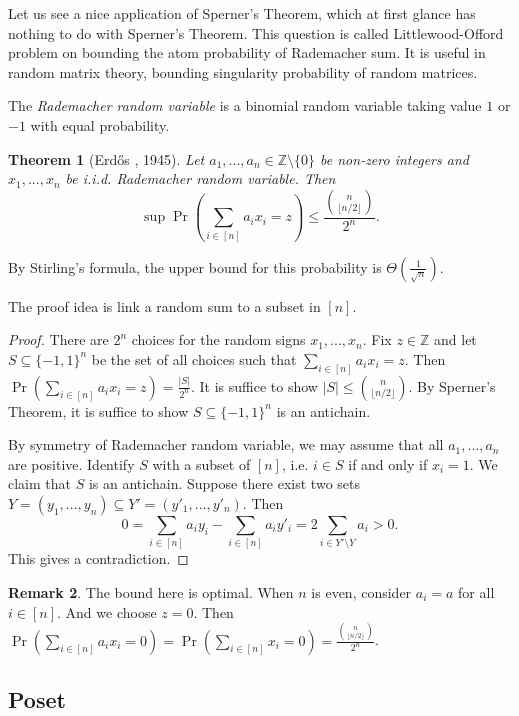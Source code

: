 \documentclass{article}
\newtheorem{theorem}{Theorem}[section]
\theoremstyle{definition}
\newtheorem{remark}[theorem]{Remark}
\def\Erdos{Erd\H{o}s}
\begin{document}
Let us see a nice application of Sperner's Theorem, which at first glance has nothing to do with Sperner's Theorem. This question is called Littlewood-Offord problem on bounding the atom probability of Rademacher sum. It is useful in random matrix theory, bounding singularity probability of random matrices. 

The \emph{Rademacher random variable} is a binomial random variable taking value $1$ or $-1$ with equal probability. 

\begin{theorem}[\Erdos{} \cite{erdos1945littlewood}, 1945]
    Let $a_1,...,a_n \in \mathbb{Z}\setminus\{0\}$ be non-zero integers and $x_1,...,x_n$ be i.i.d. Rademacher random variable. Then
    \[
    \sup \Pr(\sum_{i\in[n]}a_i x_i = z) \leq \frac{\binom{n}{\lfloor n/2 \rfloor}}{2^n}.
    \]
\end{theorem}

By Stirling's formula, the upper bound for this probability is $\Theta(\frac{1}{\sqrt{n}})$. 

The proof idea is link a random sum to a subset in $[n]$. 

\begin{proof}
    There are $2^n$ choices for the random signs $x_1,...,x_n$. Fix $z \in \mathbb{Z}$ and let $S \subseteq \{-1, 1\}^n$ be the set of all choices such that $\sum_{i\in [n]} a_i x_i = z$. Then $\Pr(\sum_{i\in [n]} a_i x_i = z) = \frac{|S|}{2^n}$. It is suffice to show $|S| \leq \binom{n}{\lfloor n/2 \rfloor}$. By Sperner's Theorem, it is suffice to show $S \subseteq \{-1, 1\}^n$ is an antichain. 

    By symmetry of Rademacher random variable, we may assume that all $a_1,...,a_n$ are positive. Identify $S$ with a subset of $[n]$, i.e. $i \in S$ if and only if $x_i = 1$. We claim that $S$ is an antichain. Suppose there exist two sets $Y = (y_1,...,y_n) \subseteq Y' = (y'_1,...,y'_n)$. Then 
    \[
    0 = \sum_{i\in[n]} a_i y_i - \sum_{i\in[n]} a_i y'_i = 2\sum_{i\in Y' \setminus Y} a_i > 0.
    \]
    This gives a contradiction. 
\end{proof} 

\begin{remark}
    The bound here is optimal. When $n$ is even, consider $a_i = a$ for all $i \in [n]$. And we choose $z = 0$. Then $\Pr(\sum_{i\in[n]} a_i x_i = 0) = \Pr(\sum_{i\in[n]} x_i = 0) = \frac{\binom{n}{\lfloor n/2 \rfloor}}{2^n}$.
\end{remark}

\subsection{Poset}
\end{document}
